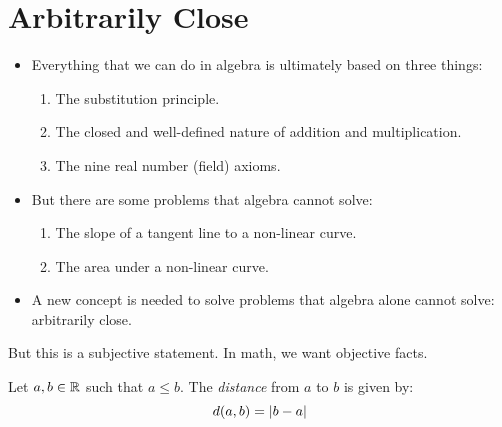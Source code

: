 \documentclass[letterpaper,12pt,fleqn]{article}
\begin{document}
\section*{Arbitrarily Close}

\begin{itemize}[left=0in]
\item Everything that we can do in algebra is ultimately based on three things:
  \begin{enumerate}
  \item The substitution principle.
  \item The closed and well-defined nature of addition and multiplication.
  \item The nine real number (field) axioms.
  \end{enumerate}

\item But there are some problems that algebra cannot solve:
  \begin{enumerate}
  \item The slope of a tangent line to a non-linear curve.
  \item The area under a non-linear curve.
  \end{enumerate}

\item A new concept is needed to solve problems that algebra alone cannot solve: arbitrarily close.
\end{itemize}

\bigskip

\begin{center}
\end{center}

\bigskip


\bigskip

But this is a subjective statement.  In math, we want objective facts.

\begin{definition}[Distance]
  Let \(a,b\in\mathbb{R}\) such that \(a\le b\).  The \emph{distance} from \(a\) to \(b\) is given by:
  \[d(a,b)=\lvert b-a\rvert\]
\end{definition}
\end{document}
